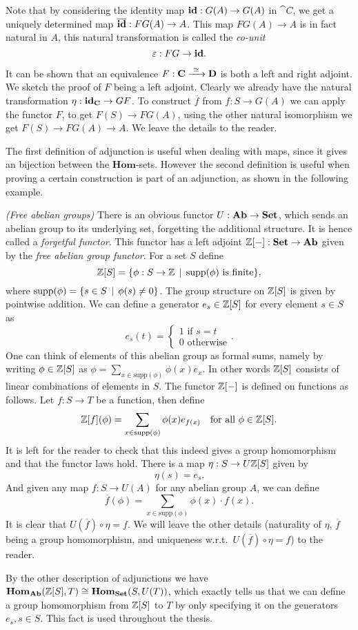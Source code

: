 Note that by considering the identity map $\mathbf{id} : G(A) \to G(A)$ in $\cat{C}$, we get a uniquely determined map $\overline{\mathbf{id}}:FG(A) \to A$. This map $FG(A) \to A$ is in fact natural in $A$, this natural transformation is called the \emph{co-unit}
$$ \varepsilon: FG \to \mathbf{id}. $$

It can be shown that an equivalence $F: \mathbf{C} \xrightarrow{\,\,{\simeq}\,\,} \mathbf{D}$ is both a left and right adjoint. We sketch the proof of $F$ being a left adjoint. Clearly we already have the natural transformation $\eta: \mathbf{id}_{\mathbf{C}} \to GF$. To construct $\overline{f}$ from $f: S \to G(A)$ we can apply the functor $F$, to get $F(S) \to FG(A)$, using the other natural isomorphism we get $F(S) \to FG(A) \to A$. We leave the details to the reader.

The first definition of adjunction is useful when dealing with maps, since it gives an bijection between the $\mathbf{Hom}$-sets. However the second definition is useful when proving a certain construction is part of an adjunction, as shown in the following example.

\begin{example}
	\emph{(Free abelian groups)} There is an obvious functor $U: \mathbf{Ab} \to \mathbf{Set}$, which sends an abelian group to its underlying set, forgetting the additional structure. It is hence called a \emph{forgetful functor}. This functor has a left adjoint $\mathbb{Z}[-]: \mathbf{Set} \to \mathbf{Ab}$  given by the \emph{free abelian group functor}. For a set $S$ define
	$$ \mathbb{Z}[S] = \{ \phi: S \to \mathbb{Z} \,\mid\, \text{supp}(\phi) \text{ is finite}\}, $$
	where $\text{supp}(\phi) = \{ s \in S \,\mid\, \phi(s) \neq 0 \}$. The group structure on $\mathbb{Z}[S]$ is given by pointwise addition. We can define a generator $e_s \in \mathbb{Z}[S]$ for every element $s \in S$ as
	$$ e_s(t) =
	\begin{cases}
		1 \text{ if } s = t \\
		0 \text{ otherwise}
	\end{cases}. $$
	One can think of elements of this abelian group as formal sums, namely by writing $\phi \in \mathbb{Z}[S]$ as $\phi = \sum_{x \in \text{supp}(\phi)}\phi(x) e_x$. In other words $\mathbb{Z}[S]$ consists of linear combinations of elements in $S$. The functor $\mathbb{Z}[-]$ is defined on functions as follows. Let $f: S \to T$ be a function, then define
	$$ \mathbb{Z}[f](\phi) = \sum_{x \in \text{supp}(\phi)} \phi(x) e_{f(x)} \quad\text{for all } \phi \in \mathbb{Z}[S]. $$
	It is left for the reader to check that this indeed gives a group homomorphism and that the functor laws hold. There is a map $\eta: S \to U\mathbb{Z}[S]$ given by
	$$ \eta(s) = e_s. $$
	And given any map $f: S \to U(A)$ for any abelian group $A$, we can define
	$$ \overline{f}(\phi) = \sum_{x \in \text{supp}(\phi)} \phi(x) \cdot f(x). $$
	It is clear that $U(\overline{f}) \circ \eta = f$. We will leave the other details (naturality of $\eta$, $\overline{f}$ being a group homomorphism, and uniqueness w.r.t.~$U(\overline{f}) \circ \eta = f$) to the reader.

	By the other description of adjunctions we have $\mathbf{Hom}_{\mathbf{Ab}}(\mathbb{Z}[S], T) \cong \mathbf{Hom}_{\mathbf{Set}}(S, U(T))$, which exactly tells us that we can define a group homomorphism from $\mathbb{Z}[S]$ to $T$ by only specifying it on the generators $e_s, s \in S$. This fact is used throughout the thesis.
\end{example}

